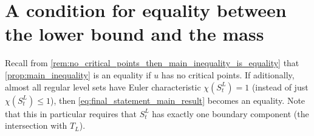 \documentclass[titlepage,numbers=noenddot,oneside,%
cleardoublepage=empty,paper=a4,fontsize=11pt,%
english,%
]{scrartcl}
\begin{document}
\section{A condition for equality between the lower bound and the mass}\label{sec:condition_for_mass_equality}
\begin{remark}\label{rem:condition_for_mass_equality}
    Recall from \cref{rem:no_critical_points_then_main_inequality_is_equality} that \cref{prop:main_inequality} is an equality if \( u \) has no critical points. If aditionally, almost all regular level sets have Euler characteristic \( \chi(S_t^L)=1 \) (instead of just \( \chi(S_t^L)\leq 1 \)), then \cref{eq:final_statement_main_result} becomes an equality. Note that this in particular requires that \( S_t^L \) has exactly one boundary component (the intersection with \( T_L \)). 
\end{remark}
\end{document}
